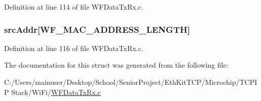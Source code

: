 Definition at line 114 of file W\+F\+Data\+Tx\+Rx.\+c.

\hypertarget{structt_w_f_rx_data_indicate_a01f7d3e001eee39fd30cbee1d63dcae5}{}
\subsubsection[{src\+Addr}]{ src\+Addr\mbox{[}W\+F\+\_\+\+M\+A\+C\+\_\+\+A\+D\+D\+R\+E\+S\+S\+\_\+\+L\+E\+N\+G\+T\+H\mbox{]}}\label{structt_w_f_rx_data_indicate_a01f7d3e001eee39fd30cbee1d63dcae5}


Definition at line 116 of file W\+F\+Data\+Tx\+Rx.\+c.



The documentation for this struct was generated from the following file\+:\begin{DoxyCompactItemize}
\item 
C\+:/\+Users/mainuser/\+Desktop/\+School/\+Senior\+Project/\+Eth\+Kit\+T\+C\+P/\+Microchip/\+T\+C\+P\+I\+P Stack/\+Wi\+Fi/\hyperlink{_w_f_data_tx_rx_8c}{W\+F\+Data\+Tx\+Rx.\+c}\end{DoxyCompactItemize}
